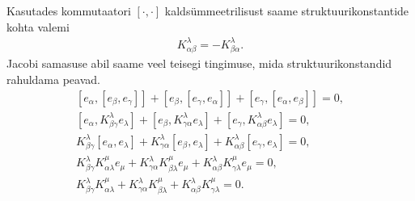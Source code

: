 Kasutades kommutaatori $[\cdot, \cdot]$ kaldsümmeetrilisust saame
struktuurikonstantide kohta valemi
\begin{align}\label{om:str-konst-kald-symm}
    K_{\alpha \beta}^{\lambda} = -K_{\beta \alpha}^{\lambda}.
\end{align}
Jacobi samasuse abil saame veel teisegi tingimuse, mida struktuurikonstandid
rahuldama peavad.
\begin{align*}
    \left[e_\alpha, \left[ e_\beta, e_\gamma \right] \right] +
    \left[e_\beta, \left[ e_\gamma, e_\alpha \right] \right] +
    \left[e_\gamma, \left[ e_\alpha, e_\beta \right] \right] = 0, \\
    \left[e_\alpha, K_{\beta \gamma}^{\lambda} e_\lambda \right] +
    \left[e_\beta, K_{\gamma \alpha}^{\lambda} e_\lambda \right] +
    \left[e_\gamma, K_{\alpha \beta}^{\lambda} e_\lambda \right] = 0, \\
    K_{\beta \gamma}^{\lambda} \left[e_\alpha, e_\lambda \right] +
    K_{\gamma \alpha}^{\lambda} \left[e_\beta, e_\lambda \right] +
    K_{\alpha \beta}^{\lambda} \left[e_\gamma, e_\lambda \right] = 0, \\
    K_{\beta \gamma}^{\lambda} K_{\alpha \lambda}^{\mu} e_{\mu} +
    K_{\gamma \alpha}^{\lambda} K_{\beta \lambda}^{\mu} e_{\mu} +
    K_{\alpha \beta}^{\lambda} K_{\gamma \lambda}^{\mu} e_{\mu} = 0, \\
    K_{\beta \gamma}^{\lambda} K_{\alpha \lambda}^{\mu} +
    K_{\gamma \alpha}^{\lambda} K_{\beta \lambda}^{\mu} +
    K_{\alpha \beta}^{\lambda} K_{\gamma \lambda}^{\mu} = 0.
\end{align*}

